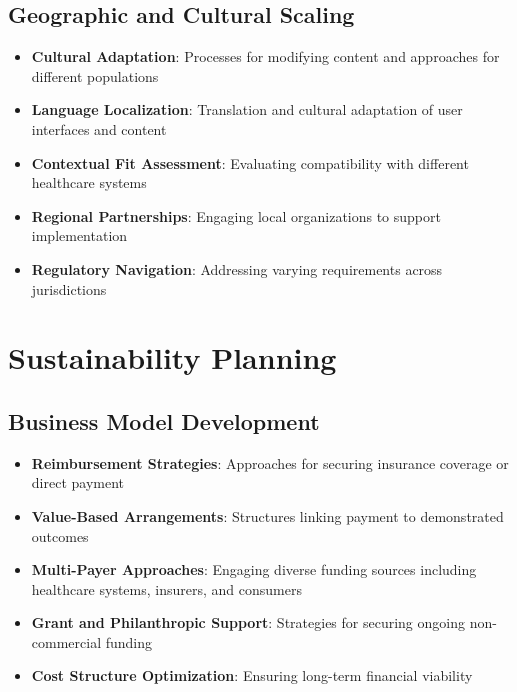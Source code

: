 \subsection{Geographic and Cultural Scaling}
\begin{itemize}
    \item \textbf{Cultural Adaptation}: Processes for modifying content and approaches for different populations
    
    \item \textbf{Language Localization}: Translation and cultural adaptation of user interfaces and content
    
    \item \textbf{Contextual Fit Assessment}: Evaluating compatibility with different healthcare systems
    
    \item \textbf{Regional Partnerships}: Engaging local organizations to support implementation
    
    \item \textbf{Regulatory Navigation}: Addressing varying requirements across jurisdictions
\end{itemize}

\section{Sustainability Planning}
\subsection{Business Model Development}
\begin{itemize}
    \item \textbf{Reimbursement Strategies}: Approaches for securing insurance coverage or direct payment
    
    \item \textbf{Value-Based Arrangements}: Structures linking payment to demonstrated outcomes
    
    \item \textbf{Multi-Payer Approaches}: Engaging diverse funding sources including healthcare systems, insurers, and consumers
    
    \item \textbf{Grant and Philanthropic Support}: Strategies for securing ongoing non-commercial funding
    
    \item \textbf{Cost Structure Optimization}: Ensuring long-term financial viability
\end{itemize}

